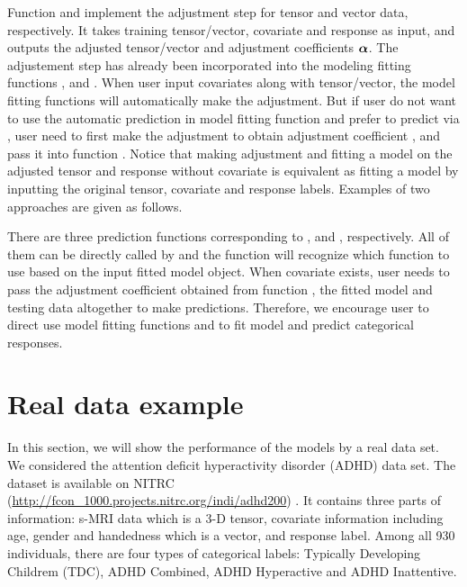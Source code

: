    Function  and  implement the adjustment step for tensor and vector data, respectively. It takes training tensor/vector, covariate and response as input, and outputs the adjusted tensor/vector and adjustment coefficients $\boldsymbol{\alpha}$. The adjustement step has already been incorporated into the modeling fitting functions ,  and . When user input covariates along with tensor/vector, the model fitting functions will automatically make the adjustment. But if user do not want to use the automatic prediction in model fitting function and prefer to predict via , user need to first make the adjustment to obtain adjustment coefficient , and pass it into function . Notice that making adjustment and fitting a model on the adjusted tensor and response without covariate is equivalent as fitting a model by inputting the original tensor, covariate and response labels. Examples of two approaches are given as follows.
   
 
 
 
 There are three prediction functions corresponding to ,  and , respectively. All of them can be directly called by  and the function will recognize which function to use based on the input fitted model object. When covariate exists, user needs to pass the adjustment coefficient obtained from function , the fitted model and testing data altogether to make predictions. Therefore, we encourage user to direct use model fitting functions  and  to fit model and predict categorical responses.
 
 
 
 \section{Real data example}\label{sec: data}
 
 In this section, we will show the performance of the models by a real data set. 
 We considered the attention deficit hyperactivity disorder (ADHD) data set. The dataset is available on NITRC (\url{http://fcon\_1000.projects.nitrc.org/indi/adhd200}) \citep{ADHD}. It contains three parts of information: s-MRI data which is a 3-D tensor, covariate information including age, gender and handedness which is a vector, and response label. Among all 930 individuals, there are four types of categorical labels: Typically Developing Childrem (TDC), ADHD Combined, ADHD Hyperactive and ADHD Inattentive.
 
